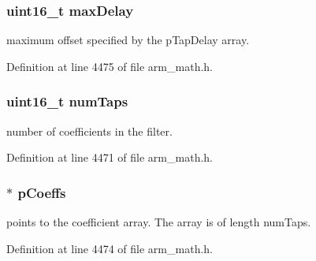 \subsubsection[{\texorpdfstring{max\+Delay}{maxDelay}}]{\setlength{\rightskip}{0pt plus 5cm}uint16\+\_\+t max\+Delay}\hypertarget{structarm__fir__sparse__instance__q7_ab25f4ee7550e6d92acff77ada283733f}{}\label{structarm__fir__sparse__instance__q7_ab25f4ee7550e6d92acff77ada283733f}
maximum offset specified by the p\+Tap\+Delay array. 

Definition at line 4475 of file arm\+\_\+math.\+h.

\subsubsection[{\texorpdfstring{num\+Taps}{numTaps}}]{\setlength{\rightskip}{0pt plus 5cm}uint16\+\_\+t num\+Taps}\hypertarget{structarm__fir__sparse__instance__q7_a751941891e47f522a7f5375fe8990aac}{}\label{structarm__fir__sparse__instance__q7_a751941891e47f522a7f5375fe8990aac}
number of coefficients in the filter. 

Definition at line 4471 of file arm\+\_\+math.\+h.

\subsubsection[{\texorpdfstring{p\+Coeffs}{pCoeffs}}]{$\ast$ p\+Coeffs}\hypertarget{structarm__fir__sparse__instance__q7_a54407554b4fe7bbbb43924e4eea45e7f}{}\label{structarm__fir__sparse__instance__q7_a54407554b4fe7bbbb43924e4eea45e7f}
points to the coefficient array. The array is of length num\+Taps. 

Definition at line 4474 of file arm\+\_\+math.\+h.

